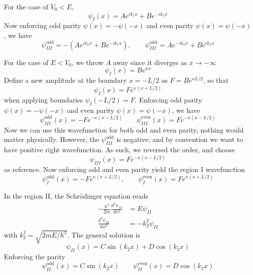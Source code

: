 \documentclass[../../../main.tex]{subfiles}
\begin{document}
For the case of $V_0<E$,
\begin{equation*}
    \psi_{I}(x) = A e^{i k_1 x} + B e^{-i k_1 x}
\end{equation*}
Now enforcing odd parity $\psi(x)=-\psi(-x)$ and even  parity $\psi(x)=\psi(-x)$, we have
\begin{equation*}
    \psi_{III}^{\text{odd}}=-\left( A e^{i k_1 x} + B e^{-i k_1 x}\right),\qquad
    \psi_{III}^{\text{odd}}=A e^{-i k_1 x} + B e^{i k_1 x}
\end{equation*}

For the case of $E<V_0$, we throw $A$ away since it diverges as $x \rightarrow -\infty$
\begin{equation*}
    \psi_{I}(x) = B e^{\kappa x}
\end{equation*}
Define a new amplitude at the boundary \(x = -L/2\) as $F = B e^{\kappa L/2}$, so that
\begin{equation*}
    \psi_{I}(x) = F e^{\kappa (x + L/2)}
\end{equation*}
when applying boundaries $\psi_{I}(-L/2) = F$.
Enforcing odd parity $\psi(x)=-\psi(-x)$ and even  parity $\psi(x)=\psi(-x)$, we have
\begin{equation*}
    \psi_{III}^{\text{odd}}(x) = -F e^{-\kappa (x - L/2)}
    \qquad
    \psi_{III}^{\text{even}}(x) = F e^{-\kappa (x - L/2)}
\end{equation*}
Now we can use this wavefunction for both odd and even parity, nothing would matter physically.
However, the $\psi_{III}^{\text{odd}}$ is negative; and by convention we want to have positive right wavefunction.
As such, we reversed the order, and choose
\begin{equation*}
    \psi_{III}(x) = F e^{-\kappa (x - L/2)}
\end{equation*}
as reference.
Now enforcing odd and even parity yield the region I wavefunction
\begin{equation*}
    \psi_{I}^{\text{odd}}(x) = -F e^{\kappa (x + L/2)},
    \qquad
    \psi_{I}^{\text{even}}(x) = F e^{\kappa (x + L/2)}
\end{equation*}

In the region II, the Schrödinger equation reads
\begin{align*}
    -\frac{\hbar^2}{2 m} \frac{d^2 \psi_{II}}{dx^2} & =  E \psi_{II}      \\
    \frac{d^2 \psi_{II}}{dx^2}                      & = - k_2^2 \psi_{II}
\end{align*}
with $k_2^2=\sqrt{2mE/\hbar^2}$.
The general solution is
\begin{equation*}
    \psi_{II}(x)=C\sin (k_2x)+D \cos (k_2x)
\end{equation*}
Enforcing the parity
\begin{equation*}
    \psi_{II}^{\text{odd}}(x) = C \sin (k_2x)
    \qquad
    \psi_{II}^{\text{even}}(x) =  D \cos (k_2x)
\end{equation*}
\end{document}
